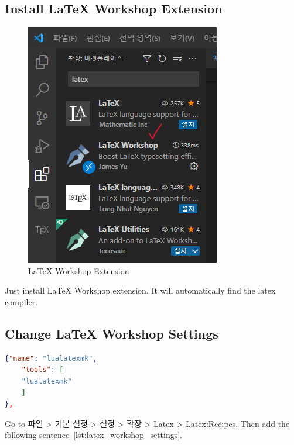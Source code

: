 \documentclass[letterpaper,12pt]{article}
\begin{document}
\subsection{Install LaTeX Workshop Extension}
\begin{figure}[ht]
        \centering \includegraphics[width=0.4\columnwidth]{latex_workshop.png}
        \caption{
                \label{fig:LaTeX Workshop} %
                LaTeX Workshop Extension
        }
\end{figure}

Just install LaTeX Workshop extension. 
It will automatically find the latex compiler.

\subsection{Change LaTeX Workshop Settings}

\begin{lstlisting}[language=json,firstnumber=1,caption={LaTeX Workshop Settings},captionpos=b, label={lst:latex_workshop_settings}]
{"name": "lualatexmk",
	"tools": [
	"lualatexmk"
	]
},
\end{lstlisting}


Go to 파일 > 기본 설정 > 설정 > 확장 > Latex > Latex:Recipes.
Then add the following sentence~\ref{lst:latex_workshop_settings}. 
\end{document}
